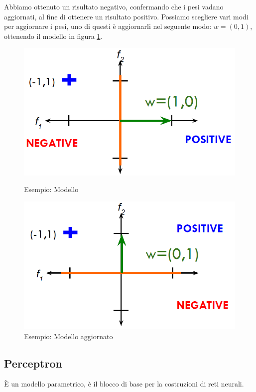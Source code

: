 	Abbiamo ottenuto un risultato negativo, confermando che i pesi vadano aggiornati, al fine di ottenere un risultato positivo. Possiamo scegliere vari modi per aggiornare i pesi, uno di questi \`e aggiornarli nel seguente modo: $w=(0,1)$, ottenendo il modello in figura \ref{fig:chapter04-03}.
	
	\begin{figure}
		\centering
		\begin{minipage}{.5\textwidth}
			\centering
			\includegraphics[width=1\linewidth]{imgs/chapter4/img2}
			\caption{Esempio: Modello}
			\label{fig:chapter04-02}
		\end{minipage}%
		\begin{minipage}{.5\textwidth}
			\centering
			\includegraphics[width=1\linewidth]{imgs/chapter4/img3}
			\caption{Esempio: Modello aggiornato}
			\label{fig:chapter04-03}
		\end{minipage}
	\end{figure}
	
	\subsection{Perceptron}
		\`E un modello parametrico, \`e il blocco di base per la costruzioni di reti neurali.

